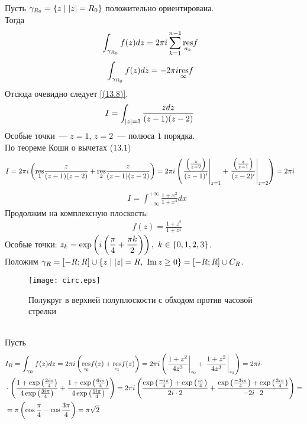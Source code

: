 Пусть $\gamma_{R_0} = \{z \mid \left|{z}\right| = R_0\}$ положительно ориентирована.
\\
Тогда
\begin{align*}
  & \int_{\gamma_{R_0}}f(z)dz = 2 \pi i \sum_{k=1}^{n-1} \underset{a_k}{\mathrm{res}}f
\end{align*}
\begin{align*}
  & \int_{\gamma_{R_0}}f(z)dz = -2 \pi i \underset{\infty}{\mathrm{res}}f
\end{align*}
Отсюда очевидно следует \eqref{(13.8)}.
\Example
\begin{align*}
  & I = \int_{\left|{z}\right| = 3}\frac{z dz}{(z-1)(z-2)}
\end{align*}
Особые точки~--- $z=1$, $z=2$~--- полюса $1$ порядка.
\\
По теореме Коши о вычетах ($13.1$)
\begin{align*}
  & I = 2 \pi i \left( \underset{1}{\mathrm{res}} \frac{z}{(z-1)(z-2)} +  \underset{2}{\mathrm{res}} \frac{z}{(z-1)(z-2)}\right) = 2 \pi i \left( \left. \frac{\left( \frac{z}{z-2} \right)}{(z-1)'} \right|_{z=1} +  \left. \frac{\left( \frac{z}{z-1} \right)}{(z-2)'} \right|_{z=2} \right) = 2 \pi i
\end{align*}
\Example
\begin{align*}
  & I = \int_{-\infty}^{+\infty}\frac{1+x^2}{1+x^4}dx
\end{align*}
Продолжим на комплексную плоскость:
\begin{align*}
  & f(z) = \frac{1+z^2}{1+z^4}
\end{align*}
Особые точки: $z_k = \exp \left( i \left( \displaystyle \frac{\pi}{4} + \displaystyle \frac{\pi
          k}{2} \right) \right), \ k \in\{0, 1, 2, 3\}$.
\\
Положим $\gamma_R = \left[ -R;R \right] \cup \{z \mid \left|{z}\right| = R, \ \mathrm{Im}\, z \geq
0 \} = \left[ -R;R \right] \cup C_R$.
\begin{figure}[h!]
		\centering
		\texttt{[image: circ.eps]}
    \caption{Полукруг в верхней полуплоскости с обходом против часовой стрелки}
		\label{fig:13.1}
\end{figure}
\\
Пусть 
\begin{align*}
  & I_R = \int_{\gamma_R}f(z)dz = 2 \pi i \left( \underset{z_0}{\mathrm{res}} f(z) +  \underset{z_1}{\mathrm{res}} f(z)\right) = 2 \pi i \left( \left.\frac{1+z^2}{4z^3}\right|_{z_0} + \left.\frac{1+z^2}{4z^3}\right|_{z_1}\right) = 2 \pi i \cdot \\
  & \cdot \left( \frac{1+\exp\left( \frac{2i \pi}{4} \right)}{4 \exp \left( \frac{3i \pi}{4} \right)} +  \frac{1+\exp\left( \frac{6i \pi}{4} \right)}{4 \exp \left( \frac{9i \pi}{4} \right)}\right) = 2 \pi i \left( \frac{\exp\left( \frac{-i\pi}{4} \right) + \exp\left( \frac{i\pi}{4} \right)}{2 i \cdot 2} +  \frac{\exp\left( \frac{-3i\pi}{4} \right) + \exp\left( \frac{3i\pi}{4} \right)}{-2 i \cdot 2}\right) = \\
  & = \pi \left( \cos \frac{\pi}{4} - \cos \frac{3\pi}{4} \right) = \pi \sqrt{2}
\end{align*}
